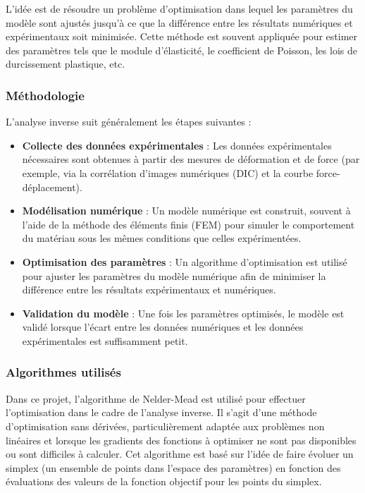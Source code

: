 \documentclass[12pt,a4paper]{article}
\begin{document}
L'idée est de résoudre un problème d'optimisation dans lequel les paramètres du modèle sont ajustés jusqu'à ce que la différence entre les résultats numériques et expérimentaux soit minimisée. Cette méthode est souvent appliquée pour estimer des paramètres tels que le module d'élasticité, le coefficient de Poisson, les lois de durcissement plastique, etc.

\subsubsection{Méthodologie}
L'analyse inverse suit généralement les étapes suivantes :
\begin{itemize}
    \item \textbf{Collecte des données expérimentales} : Les données expérimentales nécessaires sont obtenues à partir des mesures de déformation et de force (par exemple, via la corrélation d'images numériques (DIC) et la courbe force-déplacement).
    \item \textbf{Modélisation numérique} : Un modèle numérique est construit, souvent à l'aide de la méthode des éléments finis (FEM) pour simuler le comportement du matériau sous les mêmes conditions que celles expérimentées.
    \item \textbf{Optimisation des paramètres} : Un algorithme d'optimisation est utilisé pour ajuster les paramètres du modèle numérique afin de minimiser la différence entre les résultats expérimentaux et numériques. 
    \item \textbf{Validation du modèle} : Une fois les paramètres optimisés, le modèle est validé lorsque l'écart entre les données numériques et les données expérimentales est suffisamment petit.
\end{itemize}

\subsubsection{Algorithmes utilisés}
Dans ce projet, l'algorithme de Nelder-Mead est utilisé pour effectuer l'optimisation dans le cadre de l'analyse inverse. Il s'agit d'une méthode d'optimisation sans dérivées, particulièrement adaptée aux problèmes non linéaires et lorsque les gradients des fonctions à optimiser ne sont pas disponibles ou sont difficiles à calculer. Cet algorithme est basé sur l'idée de faire évoluer un simplex (un ensemble de points dans l'espace des paramètres) en fonction des évaluations des valeurs de la fonction objectif pour les points du simplex.
\end{document}
